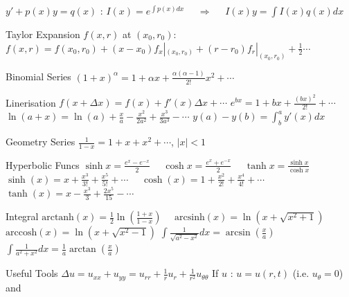 \documentclass{note}
\begin{document}
\tiny

\begin{MyTh}{$y'+p(x)y=q(x)$}
    : $I(x)=e^{\int p(x)dx}$ \ \ $\Rightarrow$ \ \ $I(x)y=\int I(x)q(x)dx$
\end{MyTh}
\begin{MyTh}{Taylor Expansion}
    $f(x,r)$ at $(x_0,r_0)$: $f(x,r)=f(x_0,r_0)+(x-x_0)f_x|_{(x_0,r_0)}+(r-r_0)f_r|_{(x_0,r_0)}+\frac{1}{2}\cdots$
\end{MyTh}

\vspace{-2pt}
\begin{MyTh}{Binomial Series}
    $(1+x)^\alpha=1+\alpha x+\frac{\alpha(\alpha-1)}{2!}x^2+\cdots$ \quad
\end{MyTh}
\begin{MyTh}{Linerisation}
    $f(x+\Delta x)=f(x)+f'(x)\Delta x+\cdots$ \quad $e^{bx}=1+bx+\frac{(bx)^2}{2!}+\cdots$ \quad $\ln(a+x)=\ln(a)+\frac{x}{a}-\frac{x^2}{2a^2}+\frac{x^3}{3a^3}-\cdots$ \quad $y(a)-y(b)=\int_b^a y'(x)dx$
\end{MyTh}

\vspace{-2pt}
\begin{MyTh}{Geometry Series}
    $\frac{1}{1-x}=1+x+x^2+\cdots$, $|x|<1$
\end{MyTh}
\begin{MyTh}{Hyperbolic Funcs}
    $\sinh x=\frac{e^x-e^{-x}}{2}$ \ \ $\cosh x=\frac{e^x+e^{-x}}{2}$ \ \ $\tanh x=\frac{\sinh x}{\cosh x}$ \quad $\sinh(x)=x+\frac{x^3}{3!}+\frac{x^5}{5!}+\cdots$ \ \ $\cosh(x)=1+\frac{x^2}{2!}+\frac{x^4}{4!}+\cdots$ \ \ $\tanh(x)=x-\frac{x^3}{3}+\frac{2x^5}{15}-\cdots$
\end{MyTh}

\vspace{-2pt}
\begin{MyTh}{Integral}
    $\text{arctanh}(x)=\frac{1}{2}\ln\left(\frac{1+x}{1-x}\right)$ \ \ $\text{arcsinh}(x)=\ln\left(x+\sqrt{x^2+1}\right)$ \ \ $\text{arccosh}(x)=\ln\left(x+\sqrt{x^2-1}\right)$ \quad $\int \frac{1}{\sqrt{a^2-x^2}}dx=\arcsin(\frac{x}{a})$ \ \ $\int \frac{1}{a^2+x^2}dx=\frac{1}{a}\arctan(\frac{x}{a})$
\end{MyTh}

\vspace{-2pt}
\begin{MyTh}{Useful Tools}
    $\Delta u=u_{xx}+u_{yy}=u_{rr}+\frac{1}{r}u_r+\frac{1}{r^2}u_{\theta\theta}$
    \quad If $u$ : $u=u(r,t)$ (i.e. $u_\theta=0$)
    \quad {} and 
\end{MyTh}
\end{document}
